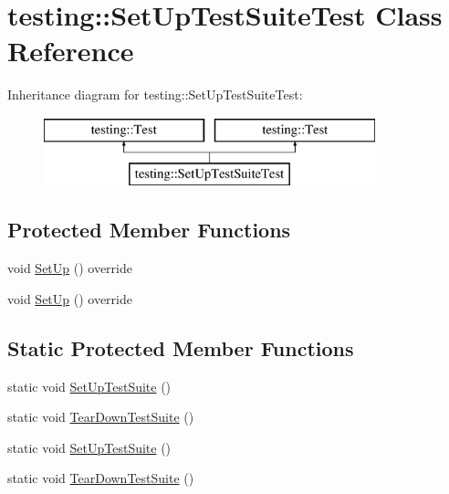 \hypertarget{classtesting_1_1_set_up_test_suite_test}{}\section{testing\+::Set\+Up\+Test\+Suite\+Test Class Reference}
\label{classtesting_1_1_set_up_test_suite_test}
Inheritance diagram for testing\+::Set\+Up\+Test\+Suite\+Test\+:\begin{figure}[H]
\begin{center}
\leavevmode
\includegraphics[height=2.000000cm]{df/dba/classtesting_1_1_set_up_test_suite_test}
\end{center}
\end{figure}
\subsection*{Protected Member Functions}
\begin{DoxyCompactItemize}
\item 
void \mbox{\hyperlink{classtesting_1_1_set_up_test_suite_test_ac01379a3be015db77866fe224807b219}{Set\+Up}} () override
\item 
void \mbox{\hyperlink{classtesting_1_1_set_up_test_suite_test_ac01379a3be015db77866fe224807b219}{Set\+Up}} () override
\end{DoxyCompactItemize}
\subsection*{Static Protected Member Functions}
\begin{DoxyCompactItemize}
\item 
static void \mbox{\hyperlink{classtesting_1_1_set_up_test_suite_test_ad64c250ae98154efebf05e3aa5e02b40}{Set\+Up\+Test\+Suite}} ()
\item 
static void \mbox{\hyperlink{classtesting_1_1_set_up_test_suite_test_a9ab506ec2496b6c79415afb635c30372}{Tear\+Down\+Test\+Suite}} ()
\item 
static void \mbox{\hyperlink{classtesting_1_1_set_up_test_suite_test_ad64c250ae98154efebf05e3aa5e02b40}{Set\+Up\+Test\+Suite}} ()
\item 
static void \mbox{\hyperlink{classtesting_1_1_set_up_test_suite_test_a9ab506ec2496b6c79415afb635c30372}{Tear\+Down\+Test\+Suite}} ()
\end{DoxyCompactItemize}
